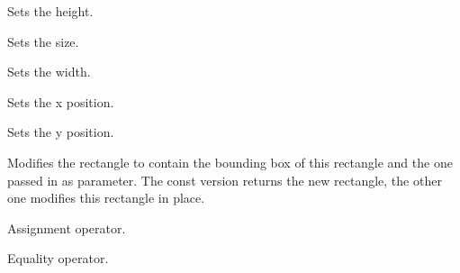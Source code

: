 \label{wxrectsetheight}


Sets the height.


\label{wxrectsetsize}


Sets the size.




\label{wxrectsetwidth}


Sets the width.


\label{wxrectsetx}


Sets the x position.


\label{wxrectsety}


Sets the y position.


\label{wxrectunion}



Modifies the rectangle to contain the bounding box of this rectangle and the
one passed in as parameter. The const version returns the new rectangle, the
other one modifies this rectangle in place.


\label{wxrectassign}


Assignment operator.


\label{wxrectequal}


Equality operator.


\label{wxrectnotequal}


